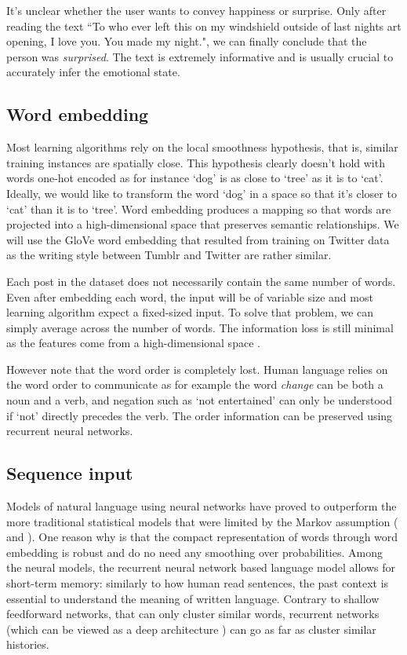 \documentclass{article} %
\begin{document}
It's unclear whether the user wants to convey happiness or surprise. Only after reading the text ``To who ever left this on my windshield outside of last nights art opening, I love you. You made my night.", we can finally conclude that the person was {\em surprised}. The text is extremely informative and is usually crucial to accurately infer the emotional state.

\subsection{Word embedding}
Most learning algorithms rely on the local smoothness hypothesis, that is, similar training instances are spatially close. This hypothesis clearly doesn't hold with words one-hot encoded as for instance `dog' is as close to `tree' as it is to `cat'. Ideally, we would like to transform the word `dog' in a space so that it's closer to `cat' than it is to `tree'. Word embedding produces a mapping so that words are projected into a high-dimensional space that preserves semantic relationships. We will use the GloVe word embedding that resulted from training on Twitter data as the writing style between Tumblr and Twitter are rather similar.

Each post in the dataset does not necessarily contain the same number of words. Even after embedding each word, the input will be of variable size and most learning algorithm expect a fixed-sized input. To solve that problem, we can simply average across the number of words. The information loss is still minimal as the features come from a high-dimensional space \citep{Flaxman-15}.

However note that the word order is completely lost. Human language relies on the word order to communicate as for example the word {\em change} can be both a noun and a verb, and negation such as `not entertained' can only be understood if `not' directly precedes the verb. The order information can be preserved using recurrent neural networks.

\subsection{Sequence input}
Models of natural language using neural networks have proved to outperform the more traditional statistical models that were limited by the Markov assumption (\citet{Bengio-03} and \citet{Goodman-01}). One reason why is that the compact representation of words through word embedding is robust \citep{Mikolov-11} and do no need any smoothing over probabilities. Among the neural models, the recurrent neural network based language model allows for short-term memory: similarly to how human read sentences, the past context is essential to understand the meaning of written language. Contrary to shallow feedforward networks, that can only cluster similar words, recurrent networks (which can be viewed as a deep architecture \citep{Bengio-07}) can go as far as cluster similar histories. 
\end{document}
